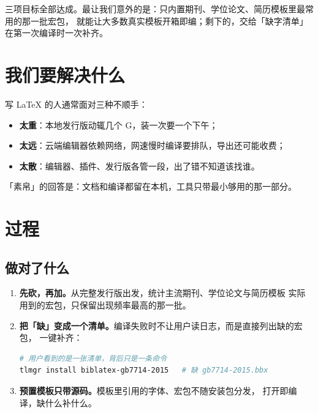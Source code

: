 \documentclass[UTF8,zihao=-4]{ctexart}
\begin{document}
\vspace{6pt}
三项目标全部达成。最让我们意外的是：只内置期刊、学位论文、简历模板里最常用的那一批宏包，
就能让大多数真实模板开箱即编；剩下的，交给「缺字清单」在第一次编译时一次补齐。

\section{我们要解决什么}

写 \LaTeX{} 的人通常面对三种不顺手：
\begin{itemize}
  \item \textbf{太重}：本地发行版动辄几个 G，装一次要一个下午；
  \item \textbf{太远}：云端编辑器依赖网络，网速慢时编译要排队，导出还可能收费；
  \item \textbf{太散}：编辑器、插件、发行版各管一段，出了错不知道该找谁。
\end{itemize}
「素帛」的回答是：文档和编译都留在本机，工具只带最小够用的那一部分。

\section{过程}

\begin{center}
\end{center}

\subsection{做对了什么}
\begin{enumerate}
  \item \textbf{先砍，再加。}从完整发行版出发，统计主流期刊、学位论文与简历模板
        实际用到的宏包，只保留出现频率最高的那一批。
  \item \textbf{把「缺」变成一个清单。}编译失败时不让用户读日志，而是直接列出缺的宏包，
        一键补齐：
\begin{lstlisting}[language=bash]
# 用户看到的是一张清单，背后只是一条命令
tlmgr install biblatex-gb7714-2015   # 缺 gb7714-2015.bbx
\end{lstlisting}
  \item \textbf{预置模板只带源码。}模板里引用的字体、宏包不随安装包分发，
        打开即编译，缺什么补什么。
\end{enumerate}
\end{document}
